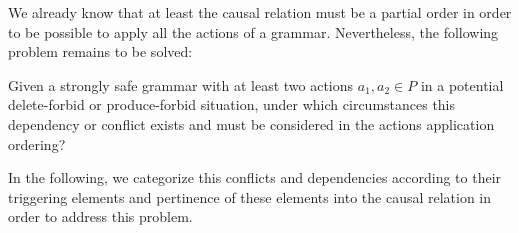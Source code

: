 We already know that at least the causal relation must be a partial order in order to be possible to apply all the actions of a grammar. Nevertheless, the following problem remains to be solved:

\begin{intuition}
  Given a strongly safe grammar \doublyTypedGraphGrammarCore{} with at least two actions $a_1, a_2 \in P$ in a potential delete-forbid or produce-forbid situation, under which circumstances this dependency or conflict exists and must be considered in the actions application ordering?
\end{intuition}

In the following, we categorize this conflicts and dependencies according to their triggering elements and pertinence of these elements into the causal relation in order to address this problem.

